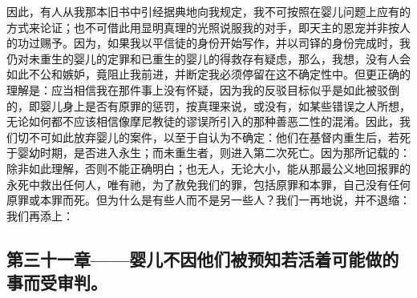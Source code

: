 因此，有人从我那本旧书中引经据典地向我规定，我不可按照在婴儿问题上应有的方式来论证；也不可借此用显明真理的光照说服我的对手，即天主的恩宠并非按人的功过赐予。因为，如果我以平信徒的身份开始写作，并以司铎的身份完成时，我仍对未重生的婴儿的定罪和已重生的婴儿的得救存有疑虑，那么，我想，没有人会如此不公和嫉妒，竟阻止我前进，并断定我必须停留在这不确定性中。但更正确的理解是：应当相信我在那件事上没有怀疑，因为我的反驳目标似乎是如此被驳倒的，即婴儿身上是否有原罪的惩罚，按真理来说，或没有，如某些错误之人所想，无论如何都不应该相信像摩尼教徒的谬误所引入的那种善恶二性的混淆。因此，我们切不可如此放弃婴儿的案件，以至于自认为不确定：他们在基督内重生后，若死于婴幼时期，是否进入永生；而未重生者，则进入第二次死亡。因为那所记载的： 除非如此理解，否则不能正确明白；也无人，无论大小，能从那最公义地回报罪的永死中救出任何人，唯有祂，为了赦免我们的罪，包括原罪和本罪，自己没有任何原罪或本罪而死。但为什么是有些人而不是另一些人？我们一再地说，并不退缩：  我们再添上：\par


\subsection{第三十一章——婴儿不因他们被预知若活着可能做的事而受审判。}

